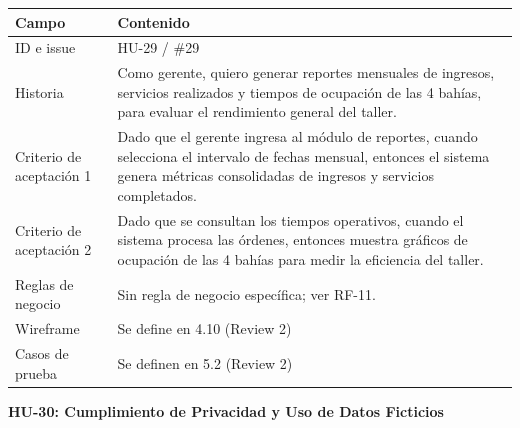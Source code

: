 {\def\LTcaptype{none} %
\begin{longtable}[]{@{}
  >{\raggedright\arraybackslash}p{}
  >{\raggedright\arraybackslash}p{}@{}}
\toprule\noalign{}
\begin{minipage}[b]{\linewidth}\raggedright
\textbf{Campo}
\end{minipage} & \begin{minipage}[b]{\linewidth}\raggedright
\textbf{Contenido}
\end{minipage} \\
\midrule\noalign{}
\endhead
\bottomrule\noalign{}
\endlastfoot
ID e issue & HU-29 / \#29 \\
Historia & Como gerente, quiero generar reportes mensuales de ingresos,
servicios realizados y tiempos de ocupación de las 4 bahías, para
evaluar el rendimiento general del taller. \\
Criterio de aceptación 1 & Dado que el gerente ingresa al módulo de
reportes, cuando selecciona el intervalo de fechas mensual, entonces el
sistema genera métricas consolidadas de ingresos y servicios
completados. \\
Criterio de aceptación 2 & Dado que se consultan los tiempos operativos,
cuando el sistema procesa las órdenes, entonces muestra gráficos de
ocupación de las 4 bahías para medir la eficiencia del taller. \\
Reglas de negocio & Sin regla de negocio específica; ver RF-11. \\
Wireframe & Se define en 4.10 (Review 2) \\
Casos de prueba & Se definen en 5.2 (Review 2) \\
\end{longtable}
}

\textbf{HU-30: Cumplimiento de Privacidad y Uso de Datos Ficticios}


